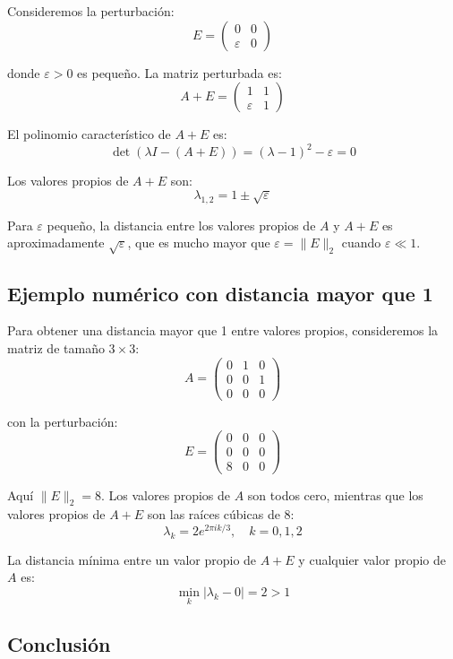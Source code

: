 \documentclass[12pt]{article}
\begin{document}
Consideremos la perturbación:
\[
E = \begin{pmatrix}
0 & 0 \\
\varepsilon & 0
\end{pmatrix}
\]

donde $\varepsilon > 0$ es pequeño. La matriz perturbada es:
\[
A + E = \begin{pmatrix}
1 & 1 \\
\varepsilon & 1
\end{pmatrix}
\]

El polinomio característico de $A + E$ es:
\[
\det(\lambda I - (A + E)) = (\lambda - 1)^2 - \varepsilon = 0
\]

Los valores propios de $A + E$ son:
\[
\lambda_{1,2} = 1 \pm \sqrt{\varepsilon}
\]

Para $\varepsilon$ pequeño, la distancia entre los valores propios de $A$ y $A + E$ es aproximadamente $\sqrt{\varepsilon}$, que es mucho mayor que $\varepsilon = \|E\|_2$ cuando $\varepsilon \ll 1$.

\subsection{Ejemplo numérico con distancia mayor que 1}

Para obtener una distancia mayor que 1 entre valores propios, consideremos la matriz de tamaño $3 \times 3$:
\[
A = \begin{pmatrix}
0 & 1 & 0 \\
0 & 0 & 1 \\
0 & 0 & 0
\end{pmatrix}
\]

con la perturbación:
\[
E = \begin{pmatrix}
0 & 0 & 0 \\
0 & 0 & 0 \\
8 & 0 & 0
\end{pmatrix}
\]

Aquí $\|E\|_2 = 8$. Los valores propios de $A$ son todos cero, mientras que los valores propios de $A + E$ son las raíces cúbicas de 8:
\[
\lambda_k = 2e^{2\pi i k/3}, \quad k = 0, 1, 2
\]

La distancia mínima entre un valor propio de $A + E$ y cualquier valor propio de $A$ es:
\[
\min_k |\lambda_k - 0| = 2 > 1
\]

\subsection{Conclusión}
\end{document}
